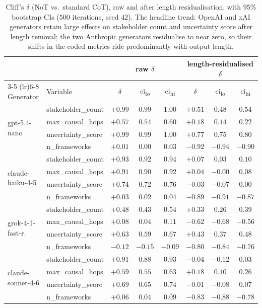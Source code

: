\documentclass[11pt]{article}
\begin{document}
\begin{table}[!tbp]
\centering
\small
\setlength{\tabcolsep}{6pt}
\begin{tabular}{llcccccc}
\toprule
& & \multicolumn{3}{c}{raw $\delta$} & \multicolumn{3}{c}{length-residualised $\delta$} \\
\cmidrule(lr){3-5} \cmidrule(lr){6-8}
Generator & Variable & $\delta$ & ci\textsubscript{lo} & ci\textsubscript{hi} & $\delta$ & ci\textsubscript{lo} & ci\textsubscript{hi} \\
\midrule
\multirow{4}{*}{gpt-5.4-nano}
  & stakeholder\_count  & $+0.99$ & $0.99$ & $1.00$ & $+0.51$ & $0.48$  & $0.54$  \\
  & max\_causal\_hops   & $+0.57$ & $0.54$ & $0.60$ & $+0.18$ & $0.14$  & $0.22$  \\
  & uncertainty\_score  & $+0.99$ & $0.99$ & $1.00$ & $+0.77$ & $0.75$  & $0.80$  \\
  & n\_frameworks       & $+0.01$ & $0.00$ & $0.03$ & $-0.92$ & $-0.94$ & $-0.90$ \\
\midrule
\multirow{4}{*}{claude-haiku-4-5}
  & stakeholder\_count  & $+0.93$ & $0.92$ & $0.94$ & $+0.07$ & $0.03$  & $0.10$  \\
  & max\_causal\_hops   & $+0.91$ & $0.90$ & $0.92$ & $+0.04$ & $-0.00$ & $0.08$  \\
  & uncertainty\_score  & $+0.74$ & $0.72$ & $0.76$ & $-0.03$ & $-0.07$ & $0.00$  \\
  & n\_frameworks       & $+0.03$ & $0.02$ & $0.04$ & $-0.89$ & $-0.91$ & $-0.87$ \\
\midrule
\multirow{4}{*}{grok-4-1-fast-r.}
  & stakeholder\_count  & $+0.48$ & $0.43$  & $0.54$ & $+0.33$ & $0.26$  & $0.39$  \\
  & max\_causal\_hops   & $+0.08$ & $0.04$  & $0.11$ & $-0.62$ & $-0.68$ & $-0.56$ \\
  & uncertainty\_score  & $+0.63$ & $0.59$  & $0.67$ & $+0.43$ & $0.37$  & $0.48$  \\
  & n\_frameworks       & $-0.12$ & $-0.15$ & $-0.09$& $-0.80$ & $-0.84$ & $-0.76$ \\
\midrule
\multirow{4}{*}{claude-sonnet-4-6}
  & stakeholder\_count  & $+0.91$ & $0.88$ & $0.93$ & $-0.04$ & $-0.12$ & $0.03$  \\
  & max\_causal\_hops   & $+0.59$ & $0.55$ & $0.63$ & $+0.18$ & $0.10$  & $0.26$  \\
  & uncertainty\_score  & $+0.69$ & $0.65$ & $0.74$ & $-0.01$ & $-0.08$ & $0.07$  \\
  & n\_frameworks       & $+0.06$ & $0.04$ & $0.09$ & $-0.83$ & $-0.88$ & $-0.78$ \\
\bottomrule
\end{tabular}
\caption{Cliff's $\delta$ (NoT vs.\ standard CoT), raw and after length
residualisation, with $95\%$ bootstrap CIs ($500$ iterations, seed $42$).
The headline trend: OpenAI and xAI generators retain large effects on
stakeholder count and uncertainty score after length removal; the two
Anthropic generators residualise to near zero, so their shifts in
the coded metrics ride predominantly with output length.}
\label{tab:effects_full}
\end{table}
\end{document}
